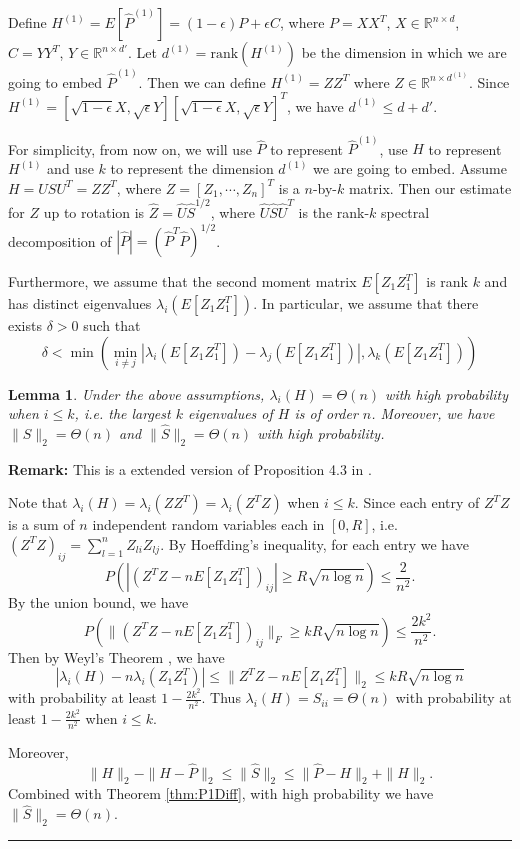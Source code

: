 \documentclass[a4paper]{article}
\newenvironment{proof}{{\bf Proof:  }}{\hfill\rule{2mm}{2mm}}
\newtheorem{lemma}[fact]{Lemma}
\begin{document}
Define $H^{(1)} = E[\hat{P}^{(1)}] = (1-\epsilon) P + \epsilon C$, where $P = X X^T$, $X \in \mathbb{R}^{n \times d}$, $C = Y Y^T$, $Y \in \mathbb{R}^{n\times d'}$.
Let $d^{(1)} = \mathrm{rank}(H^{(1)})$ be the dimension in which we are going to embed $\hat{P}^{(1)}$. Then we can define $H^{(1)} = Z Z^T$ where $Z \in \mathbb{R}^{n \times d^{(1)}}$.
Since $H^{(1)} = [\sqrt{1-\epsilon} X, \sqrt{\epsilon} Y] [\sqrt{1-\epsilon} X, \sqrt{\epsilon} Y]^T$, we have $d^{(1)} \le d+d'$.


For simplicity, from now on, we will use $\hat{P}$ to represent $\hat{P}^{(1)}$, use $H$ to represent $H^{(1)}$ and use $k$ to represent the dimension $d^{(1)}$ we are going to embed. Assume $H = U S U^T = Z Z^T$, where $Z = [Z_1, \cdots, Z_n]^T$ is a $n$-by-$k$ matrix. Then our estimate for $Z$ up to rotation is $\hat{Z} = \hat{U} \hat{S}^{1/2}$, where $\hat{U} \hat{S} \hat{U}^T$ is the rank-$k$ spectral decomposition of $|\hat{P}| = (\hat{P}^T \hat{P})^{1/2}$.

Furthermore, we assume that the second moment matrix $E[Z_1 Z_1^T]$ is rank $k$ and has distinct eigenvalues $\lambda_i(E[Z_1 Z_1^T])$. In particular, we assume that there exists $\delta > 0$ such that
\[
	\delta < \min \left( \min_{i \ne j} |\lambda_i(E[Z_1 Z_1^T]) - \lambda_j(E[Z_1 Z_1^T])|, \lambda_k(E[Z_1 Z_1^T]) \right)
\]

\begin{lemma}
\label{lemma:eigSShatL1}
Under the above assumptions, $\lambda_i(H) = \Theta(n)$ with high probability when $i \le k$, i.e. the largest $k$ eigenvalues of $H$ is of order $n$. Moreover, we have $\| S \|_2 = \Theta(n)$ and $\| \hat{S} \|_2 = \Theta(n)$ with high probability.
\end{lemma}
\textbf{Remark:} This is a extended version of Proposition 4.3 in \cite{sussman2014consistent}.

\noindent
\begin{proof}
Note that $\lambda_i(H) = \lambda_i(Z Z^T) = \lambda_i(Z^T Z)$ when $i \le k$. Since each entry of $Z^T Z$ is a sum of $n$ independent random variables each in $[0, R]$, i.e. $(Z^T Z)_{ij} = \sum_{l = 1}^n Z_{li} Z_{lj}$. By Hoeffding's inequality, for each entry we have
\[
P(|(Z^T Z - n E[Z_1 Z_1^T])_{ij}| \ge R \sqrt{n\log{n}}) \le \frac{2}{n^2}.
\]
By the union bound, we have
\[
P(\|(Z^T Z - n E[Z_1 Z_1^T])_{ij}\|_F \ge k R \sqrt{n\log{n}}) \le \frac{2 k^2}{n^2}.
\]
Then by Weyl's Theorem \cite{horn2012matrix}, we have
\[
|\lambda_i(H) - n \lambda_i(Z_1 Z_1^T)| \le \|Z^T Z - n E[Z_1 Z_1^T]\|_2 \le k R \sqrt{n\log{n}}
\]
with probability at least $1 - \frac{2 k^2}{n^2}$.
Thus $\lambda_i(H) = S_{ii} = \Theta(n)$ with probability at least $1 - \frac{2 k^2}{n^2}$ when $i \le k$.

Moreover,
\[
\| H \|_2 - \|H - \hat{P}\|_2 \le \|\hat{S}\|_2 \le \|\hat{P} - H\|_2 + \|H\|_2.
\]
Combined with Theorem \ref{thm:P1Diff}, with high probability we have $\|\hat{S}\|_2 = \Theta(n)$.
\end{proof}
\end{document}
